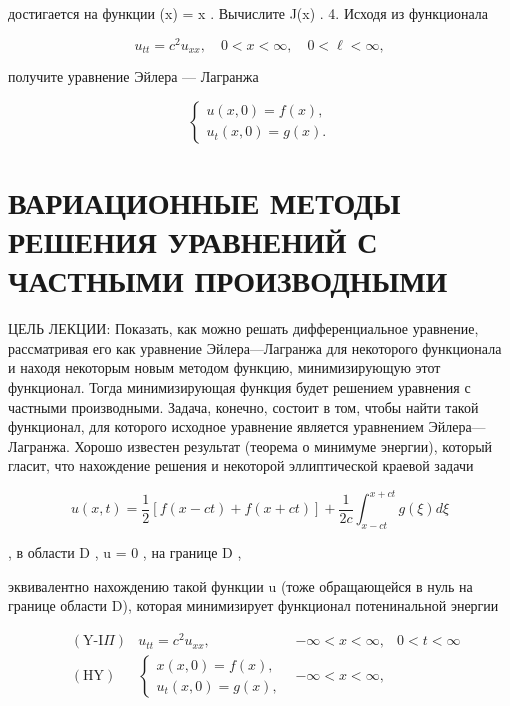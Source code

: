 \documentclass[
  ukrainian,
]{article}
\begin{document}
достигается на функции (x) = \sin x . Вычислите J(\sin x) .
4. Исходя из функционала

\[
u_{tt} = c^2 u_{xx}, \quad 0 < x < \infty, \quad 0 < \ell < \infty,
\]

получите уравнение Эйлера --- Лагранжа

\[
\begin{cases} u(x, 0) = f(x), \\ u_t(x, 0) = g(x). \end{cases}
\]

\section{ВАРИАЦИОННЫЕ МЕТОДЫ РЕШЕНИЯ УРАВНЕНИЙ С ЧАСТНЫМИ
ПРОИЗВОДНЫМИ}\label{ux432ux430ux440ux438ux430ux446ux438ux43eux43dux43dux44bux435-ux43cux435ux442ux43eux434ux44b-ux440ux435ux448ux435ux43dux438ux44f-ux443ux440ux430ux432ux43dux435ux43dux438ux439-ux441-ux447ux430ux441ux442ux43dux44bux43cux438-ux43fux440ux43eux438ux437ux432ux43eux434ux43dux44bux43cux438}

ЦЕЛЬ ЛЕКЦИИ: Показать, как можно решать дифференциальное уравнение,
рассматривая его как уравнение Эйлера---Лагранжа для некоторого
функционала и находя некоторым новым методом функцию, минимизирующую
этот функционал. Тогда минимизирующая функция будет решением уравнения с
частными производными. Задача, конечно, состоит в том, чтобы найти такой
функционал, для которого исходное уравнение является уравнением
Эйлера---Лагранжа. Хорошо известен результат (теорема о минимуме
энергии), который гласит, что нахождение решения и некоторой
эллиптической краевой задачи

\[
u(x, t) = \frac{1}{2} [f(x-ct) + f(x+ct)] + \frac{1}{2c} \int_{x-ct}^{x+ct} g(\xi) d\xi
\]

, в области D , u = 0 , на границе D ,

эквивалентно нахождению такой функции u (тоже обращающейся в нуль на
границе области D), которая минимизирует функционал потенинальной
энергии

\[
\begin{aligned} & (\text{Y-I}\Pi) & u_{tt} = c^2 u_{xx}, & -\infty < x < \infty, & 0 < t < \infty \\ & (\text{HY}) & \begin{cases} x(x, 0) = f(x), \\ u_t(x, 0) = g(x), \end{cases} & -\infty < x < \infty, \end{aligned}
\]
\end{document}
